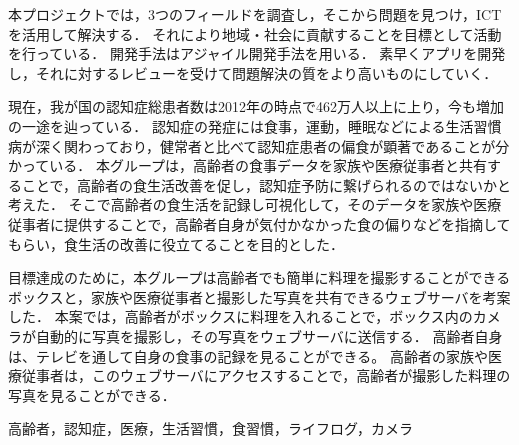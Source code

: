 \documentclass[../report]{subfiles}
\begin{document}
\begin{jabstract}
本プロジェクトでは，3つのフィールドを調査し，そこから問題を見つけ，ICTを活用して解決する．
それにより地域・社会に貢献することを目標として活動を行っている．
開発手法はアジャイル開発手法を用いる．
素早くアプリを開発し，それに対するレビューを受けて問題解決の質をより高いものにしていく．

現在，我が国の認知症総患者数は2012年の時点で462万人以上に上り，今も増加の一途を辿っている．
認知症の発症には食事，運動，睡眠などによる生活習慣病が深く関わっており，健常者と比べて認知症患者の偏食が顕著であることが分かっている．
本グループは，高齢者の食事データを家族や医療従事者と共有することで，高齢者の食生活改善を促し，認知症予防に繋げられるのではないかと考えた．
そこで高齢者の食生活を記録し可視化して，そのデータを家族や医療従事者に提供することで，高齢者自身が気付かなかった食の偏りなどを指摘してもらい，食生活の改善に役立てることを目的とした．

目標達成のために，本グループは高齢者でも簡単に料理を撮影することができるボックスと，家族や医療従事者と撮影した写真を共有できるウェブサーバを考案した．
本案では，高齢者がボックスに料理を入れることで，ボックス内のカメラが自動的に写真を撮影し，その写真をウェブサーバに送信する．
高齢者自身は、テレビを通して自身の食事の記録を見ることができる。
高齢者の家族や医療従事者は，このウェブサーバにアクセスすることで，高齢者が撮影した料理の写真を見ることができる．
\begin{jkeyword}
高齢者，認知症，医療，生活習慣，食習慣，ライフログ，カメラ
\end{jkeyword}
\end{jabstract}
\end{document}
